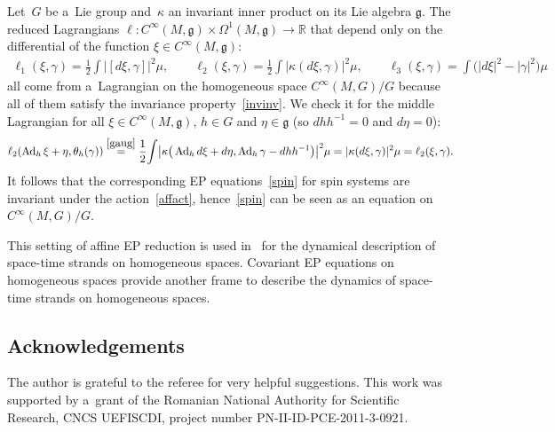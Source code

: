 \documentclass[pdftex]{sigma}
\numberwithin{equation}{section}
\begin{document}
\begin{Example}
Let~$G$ be a~Lie group and~$\kappa$ an invariant inner product on its Lie algebra $\mathfrak g$.
The reduced Lagrangians $\ell:C^{\infty}(M,\mathfrak g)\times\Omega^1(M,\mathfrak g)\to\mathbb R$ that depend only on
the dif\/ferential of the function $\xi\in C^{\infty}(M,\mathfrak g)$:
\begin{gather*}
\ell_1(\xi,\gamma)=\frac12\int|[d\xi,\gamma]|^2\mu,
\qquad
\ell_2(\xi,\gamma)=\frac12\int|\kappa(d\xi,\gamma)|^2\mu,
\qquad
\ell_3(\xi,\gamma)=\int\big(|d\xi|^2-|\gamma|^2\big)\mu
\end{gather*}
all come from a~Lagrangian on the homogeneous space $C^{\infty}(M,G)/G$ because all of them satisfy the invariance
property~\eqref{invinv}.
We check it for the middle Lagrangian for all $\xi\in C^{\infty}(M,\mathfrak g)$, $h\in G$ and $\eta\in\mathfrak g$ (so
$dhh^{-1}=0$ and $d\eta=0$):
\begin{gather*}
\ell_2(\operatorname{Ad}_h\xi+\eta,\theta_h(\gamma))
\stackrel{\eqref{gaug}}{=}
\frac12\!\int\!\big|\kappa\big(\operatorname{Ad}_hd\xi+d\eta,\operatorname{Ad}_h\gamma-dhh^{-1}\big)\big|^2\mu
=|\kappa(d\xi,\gamma)|^2\mu=\ell_2(\xi,\gamma).
\end{gather*}
It follows that the corresponding EP equations~\eqref{spin} for spin systems are invariant under the
action~\eqref{affact}, hence~\eqref{spin} can be seen as an equation on $C^{\infty}(M,G)/G$.

This setting of af\/f\/ine EP reduction is used in~\cite{V} for the dynamical description of space-time strands on
homogeneous spaces.
Covariant EP equations on homogeneous spaces provide another frame to describe the dynamics of space-time strands on
homogeneous spaces.
\end{Example}

\subsection*{Acknowledgements}

The author is grateful to the referee for very helpful suggestions.
This work was supported by a~grant of the Romanian National Authority for Scientif\/ic Research, CNCS UEFISCDI, project
number PN-II-ID-PCE-2011-3-0921.

\vspace{-1mm}
\end{document}
